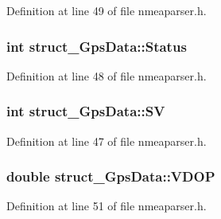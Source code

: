 \-Definition at line 49 of file nmeaparser.\-h.

\hypertarget{group___g_p_s_gadget_plugin_gafecfb74415dbfe5f6bc3c950183eb3b2}{
\subsubsection[{\-Status}]{\setlength{\rightskip}{0pt plus 5cm}int {\bf struct\-\_\-\-Gps\-Data\-::\-Status}}}\label{group___g_p_s_gadget_plugin_gafecfb74415dbfe5f6bc3c950183eb3b2}


\-Definition at line 48 of file nmeaparser.\-h.

\hypertarget{group___g_p_s_gadget_plugin_gad4c8228c92e708ffbf1205af7955a571}{
\subsubsection[{\-S\-V}]{\setlength{\rightskip}{0pt plus 5cm}int {\bf struct\-\_\-\-Gps\-Data\-::\-S\-V}}}\label{group___g_p_s_gadget_plugin_gad4c8228c92e708ffbf1205af7955a571}


\-Definition at line 47 of file nmeaparser.\-h.

\hypertarget{group___g_p_s_gadget_plugin_ga0c803c003d3d1261b1519a4b1f561ebe}{
\subsubsection[{\-V\-D\-O\-P}]{\setlength{\rightskip}{0pt plus 5cm}double {\bf struct\-\_\-\-Gps\-Data\-::\-V\-D\-O\-P}}}\label{group___g_p_s_gadget_plugin_ga0c803c003d3d1261b1519a4b1f561ebe}


\-Definition at line 51 of file nmeaparser.\-h.



